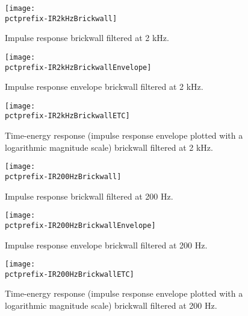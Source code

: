 \documentclass[a4paper,titlepage]{article}
\newcommand{\pctprefix}{T}
\newcommand{\pctwidth}{1.0}
\begin{document}
\begin{figure}
\begin{minipage}{\textwidth}
\begin{center}
\texttt{[image: \\pctprefix-IR2kHzBrickwall]}
\caption{Impulse  response  brickwall  filtered  at 2 kHz.}
\end{center}
\end{minipage}


\begin{minipage}{\textwidth}
\begin{center}
\texttt{[image: \\pctprefix-IR2kHzBrickwallEnvelope]}
\caption{Impulse  response  envelope brickwall  filtered at 2 kHz.}
\end{center}
\end{minipage}
\end{figure}

\clearpage

\begin{figure}
\begin{minipage}{\textwidth}
\begin{center}
\texttt{[image: \\pctprefix-IR2kHzBrickwallETC]}
\caption{Time-energy response (impulse  response envelope plotted with a
logarithmic magnitude scale) brickwall filtered at 2 kHz.}
\end{center}
\end{minipage}


\begin{minipage}{\textwidth}
\begin{center}
\texttt{[image: \\pctprefix-IR200HzBrickwall]}
\caption{Impulse  response brickwall  filtered at 200  Hz.}
\end{center}
\end{minipage}
\end{figure}

\clearpage

\begin{figure}
\begin{minipage}{\textwidth}
\begin{center}
\texttt{[image: \\pctprefix-IR200HzBrickwallEnvelope]}
\caption{Impulse  response  envelope brickwall filtered at 200 Hz.}
\end{center}
\end{minipage}

\begin{minipage}{\textwidth}
\begin{center}
\texttt{[image: \\pctprefix-IR200HzBrickwallETC]}
\caption{Time-energy response (impulse  response envelope plotted with a
logarithmic magnitude scale) brickwall filtered at 200 Hz.}
\end{center}
\end{minipage}
\end{figure}
\end{document}
